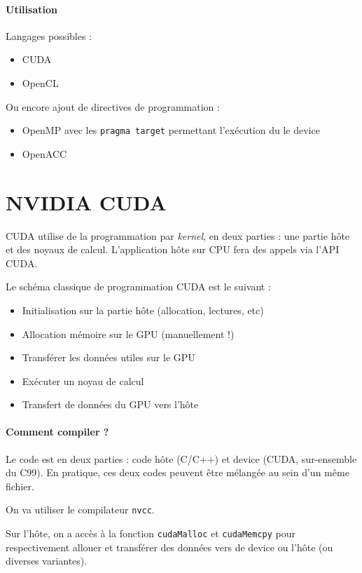 \documentclass{article}
\begin{document}
\paragraph{Utilisation}
Langages possibles :
\begin{itemize}
\item CUDA
\item OpenCL
\end{itemize}

Ou encore ajout de directives de programmation :
\begin{itemize}
\item OpenMP avec les \texttt{pragma target} permettant l'exécution du le device
\item OpenACC
\end{itemize}

\section{NVIDIA CUDA}
CUDA utilise de la programmation par \emph{kernel}, en deux parties : une partie hôte et des noyaux de calcul. L'application hôte sur CPU fera des appels via l'API CUDA.

Le schéma classique de programmation CUDA est le suivant :
\begin{itemize}
\item Initialisation sur la partie hôte (allocation, lectures, etc)
\item Allocation mémoire sur le GPU (manuellement !)
\item Transférer les données utiles sur le GPU
\item Exécuter un noyau de calcul
\item Transfert de données du GPU vers l'hôte
\end{itemize}

\paragraph{Comment compiler ?}
Le code est en deux parties : code hôte (C/C++) et device (CUDA, sur-ensemble du C99).
En pratique, ces deux codes peuvent être mélangée au sein d'un même fichier.

On va utiliser le compilateur \texttt{nvcc}.
\bigskip

Sur l'hôte, on a accès à la fonction \texttt{cudaMalloc} et \texttt{cudaMemcpy} pour respectivement allouer et transférer des données vers de device ou l'hôte (ou diverses variantes).
\end{document}
